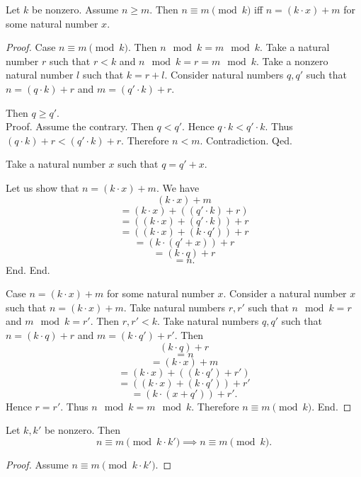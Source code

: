 \documentclass[../../natural-numbers.ftl.tex]{subfiles}
\begin{document}
\begin{forthel}
    \begin{proposition}[NN 03 03 376294]
      Let $k$ be nonzero.
      Assume $n \geq m$.
      Then $n \equiv m \pmod{k}$ iff $n = (k \cdot x) + m$ for some natural number $x$.
    \end{proposition}
    \begin{proof}
      Case $n \equiv m \pmod{k}$.
        Then $n \mod k = m \mod k$.
        Take a natural number $r$ such that $r < k$ and $n \mod k = r = m \mod k$.
        Take a nonzero natural number $l$ such that $k = r + l$.
        Consider natural numbers $q,q'$ such that $n = (q \cdot k) + r$ and $m = (q' \cdot k) + r$.

        Then $q \geq q'$. \\
        Proof.
          Assume the contrary.
          Then $q < q'$.
          Hence $q \cdot k < q' \cdot k$.
          Thus $(q \cdot k) + r < (q' \cdot k) + r$.
          Therefore $n < m$.
          Contradiction.
        Qed.

        Take a natural number $x$ such that $q = q' + x$.

        Let us show that $n = (k \cdot x) + m$.
          We have
          \[   (k \cdot x) + m \]
          \[ = (k \cdot x) + ((q' \cdot k) + r) \]
          \[ = ((k \cdot x) + (q' \cdot k)) + r \]
          \[ = ((k \cdot x) + (k \cdot q')) + r \]
          \[ = (k \cdot (q' + x)) + r \]
          \[ = (k \cdot q) + r \]
          \[ = n. \]
        End.
      End.

      Case $n = (k \cdot x) + m$ for some natural number $x$.
        Consider a natural number $x$ such that $n = (k \cdot x) + m$.
        Take natural numbers $r,r'$ such that $n \mod k = r$ and $m \mod k = r'$.
        Then $r,r' < k$.
        Take natural numbers $q,q'$ such that $n = (k \cdot q) + r$ and $m = (k \cdot q') + r'$.
        Then
        \[   (k \cdot q) + r \]
        \[ = n \]
        \[ = (k \cdot x) + m \]
        \[ = (k \cdot x) + ((k \cdot q') + r') \]
        \[ = ((k \cdot x) + (k \cdot q')) + r' \]
        \[ = (k \cdot (x + q')) + r'. \]
        Hence $r = r'$.
        Thus $n \mod k = m \mod k$.
        Therefore $n \equiv m \pmod{k}$.
      End.
    \end{proof}

    \begin{proposition}[NN 03 03 665599]
      Let $k,k'$ be nonzero.
      Then \[ n \equiv m \pmod{k \cdot k'} \implies n \equiv m \pmod{k}. \]
    \end{proposition}
    \begin{proof}
      Assume $n \equiv m \pmod{k \cdot k'}$.


\end{proof}
\end{forthel}
\end{document}
